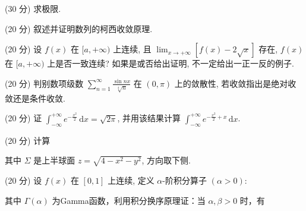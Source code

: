 \par{}
(30 分) 求极限.\par
\nopagebreak[4]
(20 分) 叙述并证明数列的柯西收敛原理.\par
(20 分) 设 $f(x)$ 在 $[a, +\infty)$ 上连续, 且 $\lim_{x \to +\infty} [f(x) - 2\sqrt{x}]$ 存在, $f(x)$ 在 $[a, +\infty)$ 上是否一致连续? 如果是或否给出证明, 不一定给出一正一反的例子.\par
(20 分) 判别数项级数 $\sum_{n=1}^{\infty} \frac{\sin nx}{\sqrt[4]{n}}$ 在 $(0, \pi)$ 上的敛散性, 若收敛指出是绝对收敛还是条件收敛.\par
(20 分) 证 $\int_{-\infty}^{+\infty} e^{-\frac{x^2}{2}} \, \mathrm{d}x = \sqrt{2\pi}$, 并用该结果计算 $\int_{-\infty}^{+\infty} e^{-\frac{x^2}{2} + x} \, \mathrm{d}x$.\par
\par{}
(20 分) 计算\par
\nopagebreak[4]
其中 $\Sigma$ 是上半球面 $z = \sqrt{4 - x^2 - y^2}$, 方向取下侧.\par
\par{}
(20 分) 设 $f(x)$ 在 $[0,1]$ 上连续, 定义 $\alpha$-阶积分算子 $(\alpha > 0)$:\par
\nopagebreak[4]
\par{}
其中 $\Gamma (\alpha)$ 为Gamma函数，利用积分换序原理证：当 $\alpha ,\beta >0$ 时，有\par
\nopagebreak[4]
